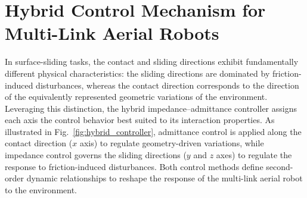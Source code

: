 \section{Hybrid Control Mechanism for Multi-Link Aerial Robots}

In surface-sliding tasks, the contact and sliding directions exhibit fundamentally different physical characteristics: the sliding directions are dominated by friction-induced disturbances, whereas the contact direction corresponds to the direction of the equivalently represented geometric variations of the environment. Leveraging this distinction, the hybrid impedance--admittance controller assigns each axis the control behavior best suited to its interaction properties.  As illustrated in Fig.~\ref{fig:hybrid_controller}, admittance control is applied along the contact direction ($x$ axis) to regulate geometry-driven variations, while impedance control governs the sliding directions ($y$ and $z$ axes) to regulate the response to friction-induced disturbances. Both control methods define second-order dynamic relationships to reshape the response of the multi-link aerial robot to the environment.

